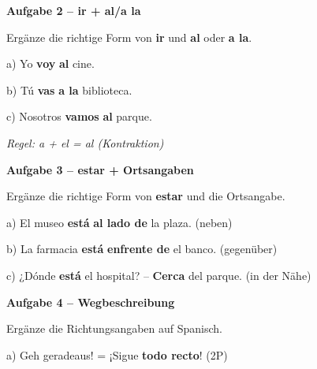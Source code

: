 \documentclass[11pt, a4paper]{article}
\newcommand{\fachfarbe}{spanisch}
\newcommand{\punktebox}[1]{\hfill\fbox{\small \_\_\_/#1}}
\newcommand{\lsg}[1]{\textcolor{loesung}{\textbf{#1}}}
\newenvironment{aufgabe}[1]{%
    \needspace{5\baselineskip}%
    \nopagebreak[4]%
    \vspace{10pt}
    \noindent\textbf{\textcolor{\fachfarbe}{Aufgabe #1}}
    \nopagebreak[4]%
    \vspace{5pt}
    \nopagebreak[4]%
    \begin{list}{}{\leftmargin=0pt}
    \item[]
}{%
    \end{list}
}
\newcommand{\es}[1]{\textcolor{\fachfarbe}{\textbf{#1}}}
\begin{document}
\begin{aufgabe}{2 -- ir + al/a la}
Ergänze die richtige Form von \es{ir} und \es{al} oder \es{a la}. \punktebox{6}
\end{aufgabe}

\noindent
a) Yo \lsg{voy} \lsg{al} cine.

\vspace{0.8em}

\noindent
b) Tú \lsg{vas} \lsg{a la} biblioteca.

\vspace{0.8em}

\noindent
c) Nosotros \lsg{vamos} \lsg{al} parque.

\vspace{0.5em}
\textcolor{loesung}{\textit{Regel: a + el = al (Kontraktion)}}

\vspace{15pt}


\begin{aufgabe}{3 -- estar + Ortsangaben}
Ergänze die richtige Form von \es{estar} und die Ortsangabe. \punktebox{6}
\end{aufgabe}

\noindent
a) El museo \lsg{está} \lsg{al lado de} la plaza. (neben)

\vspace{0.8em}

\noindent
b) La farmacia \lsg{está} \lsg{enfrente de} el banco. (gegenüber)

\vspace{0.8em}

\noindent
c) ¿Dónde \lsg{está} el hospital? -- \lsg{Cerca} del parque. (in der Nähe)

\vspace{15pt}


\begin{aufgabe}{4 -- Wegbeschreibung}
Ergänze die Richtungsangaben auf Spanisch. \punktebox{6}
\end{aufgabe}

\noindent
a) Geh geradeaus! = ¡Sigue \lsg{todo recto}! \hfill (2P)

\vspace{0.8em}
\end{document}
